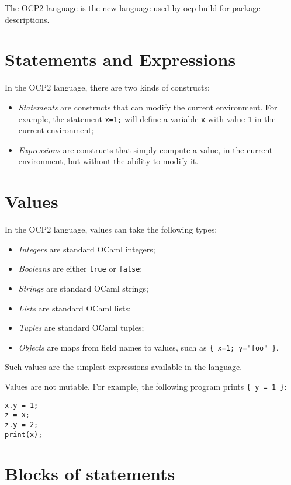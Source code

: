 

The OCP2 language is the new language used by ocp-build for package
descriptions.

\section{Statements and Expressions}

In the OCP2 language, there are two kinds of constructs:
\begin{itemize}
\item \emph{Statements} are constructs that can modify the current
  environment. For example, the statement \verb+x=1;+ will define a
  variable \verb-x- with value \verb-1- in the current environment;
\item \emph{Expressions} are constructs that simply compute a value,
  in the current environment, but without the ability to modify it.
\end{itemize}

\section{Values}

In the OCP2 language, values can take the following types:
\begin{itemize}
\item \emph{Integers} are standard OCaml integers;
\item \emph{Booleans} are either \verb+true+ or \verb+false+;
\item \emph{Strings} are standard OCaml strings;
\item \emph{Lists} are standard OCaml lists;
\item \emph{Tuples} are standard OCaml tuples;
\item \emph{Objects} are maps from field names to values, such as
  \verb+{ x=1; y="foo" }+.
\end{itemize}

Such values are the simplest expressions available in the
language.

Values are not mutable. For example, the following program prints
\verb+{ y = 1 }+:
\begin{verbatim}
x.y = 1;
z = x;
z.y = 2;
print(x);
\end{verbatim}

\section{Blocks of statements}

